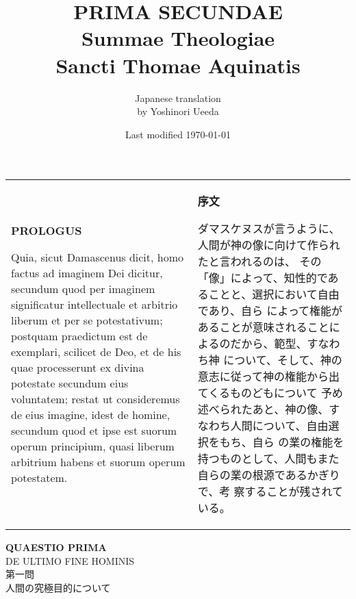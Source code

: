 \documentclass[10pt]{jsarticle} %
\title{{\bf PRIMA SECUNDAE}\\{\HUGE Summae Theologiae}\\Sancti Thomae
Aquinatis}
\author{Japanese translation\\by Yoshinori {\sc Ueeda}}
\date{Last modified \today}
\begin{document}
\maketitle
\pagestyle{fancy}

\begin{longtable}{p{21em}p{21em}}
{\bfseries PROLOGUS}

Quia, sicut Damascenus dicit, homo factus ad
imaginem Dei dicitur, secundum quod per imaginem significatur
intellectuale et arbitrio liberum et per se potestativum; postquam
praedictum est de exemplari, scilicet de Deo, et de his quae
processerunt ex divina potestate secundum eius voluntatem; restat ut
consideremus de eius imagine, idest de homine, secundum quod et ipse est
suorum operum principium, quasi liberum arbitrium habens et suorum
operum potestatem.


&
{\bfseries 序文}

ダマスケヌスが言うように、人間が神の像に向けて作られたと言われるのは、
 その「像」によって、知性的であることと、選択において自由であり、自ら
 によって権能があることが意味されることによるのだから、範型、すなわち神
 について、そして、神の意志に従って神の権能から出てくるものどもについて
 予め述べられたあと、神の像、すなわち人間について、自由選択をもち、自ら
 の業の権能を持つものとして、人間もまた自らの業の根源であるかぎりで、考
 察することが残されている。

\end{longtable}

\newpage
{}
\begin{center}
 {\Large {\bf QUAESTIO PRIMA}}\\
 {\large DE ULTIMO FINE HOMINIS}\\

 {\Large 第一問\\人間の究極目的について}
\end{center}
\end{document}
